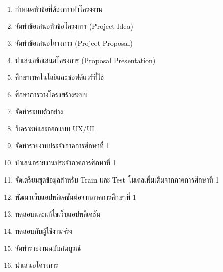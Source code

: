 \documentclass[12pt,oneside,openright,a4paper]{cpe-thai-project}
\begin{document}
\begin{enumerate}
  \item กำหนดหัวข้อที่ต้องการทำโครงงาน 
  \item จัดทำข้อเสนอหัวข้อโครงการ (Project Idea)
  \item จัดทำข้อเสนอโครงการ (Project Proposal)
  \item นำเสนอข้อเสนอโครงการ (Proposal Presentation)
  \item ศึกษาเทคโนโลยีและซอฟต์แวร์ที่ใช้
 \item ศึกษาการวางโครงสร้างระบบ
 \item จัดทำระบบตัวอย่าง
 \item วิเคราะห์และออกแบบ UX/UI
 \item จัดทำรายงานประจำภาคการศึกษาที่ 1
 \item นำเสนอรายงานประจำภาคการศึกษาที่ 1
 \item จัดเตรียมชุดข้อมูลสำหรับ Train และ Test โมเดลเพิ่มเติมจากภาคการศึกษาที่ 1
 \item พัฒนาเว็บแอปพลิเคชันต่อจากภาคการศึกษาที่ 1
 \item ทดสอบและแก้ไขเว็บแอปพลิเคชัน
 \item ทดสอบกับผู้ใช้งานจริง
 \item จัดทำรายงานฉบับสมบูรณ์
 \item นำเสนอโครงการ
\end{enumerate}
\end{document}
